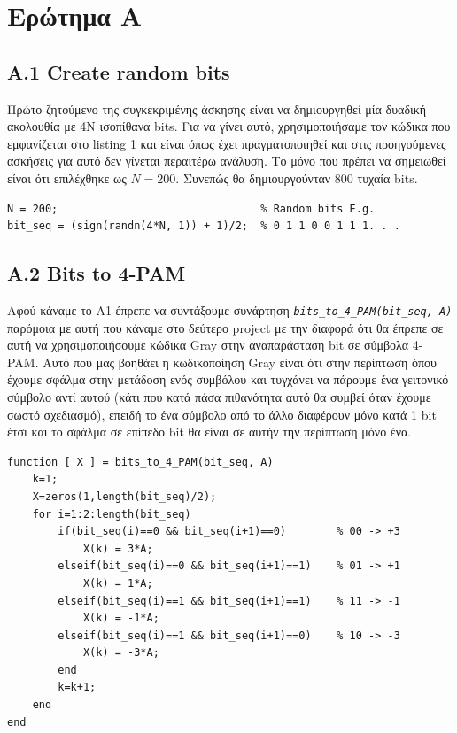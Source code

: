 \documentclass[11pt]{article}
\begin{document}
    \section*{Ερώτημα Α} 
    
    \subsection*{A.1 Create random bits}
    Πρώτο ζητούμενο της συγκεκριμένης άσκησης είναι να δημιουργηθεί μία δυαδική ακολουθία με 4Ν ισοπίθανα bits. 
    Για να γίνει αυτό, χρησιμοποιήσαμε τον κώδικα που εμφανίζεται στο listing 1 και είναι όπως έχει πραγματοποιηθεί και στις προηγούμενες ασκήσεις για αυτό δεν γίνεται περαιτέρω ανάλυση. 
    Το μόνο που πρέπει να σημειωθεί είναι ότι επιλέχθηκε ως $Ν = 200$. 
    Συνεπώς θα δημιουργούνταν 800 τυχαία bits.
    
   \begin{lstlisting}[caption = {A.1 Create random bits}]
% A.1
N = 200;                                % Random bits E.g. 
bit_seq = (sign(randn(4*N, 1)) + 1)/2;  % 0 1 1 0 0 1 1 1. . .
    \end{lstlisting}
    
    \subsection*{A.2 Bits to 4-PAM} 
    Αφού κάναμε το Α1 έπρεπε να συντάξουμε συνάρτηση \emph{\texttt{bits\_to\_4\_PAM(bit\_seq, A)}} παρόμοια με αυτή που κάναμε στο δεύτερο project με την διαφορά ότι θα έπρεπε σε αυτή να χρησιμοποιήσουμε κώδικα Gray στην αναπαράσταση bit σε σύμβολα 4-PAM. 
    Αυτό που μας βοηθάει η κωδικοποίηση Gray είναι ότι στην περίπτωση όπου έχουμε σφάλμα στην μετάδοση ενός συμβόλου και τυγχάνει να πάρουμε ένα γειτονικό σύμβολο αντί αυτού (κάτι που κατά πάσα πιθανότητα αυτό θα συμβεί όταν έχουμε σωστό σχεδιασμό), επειδή το ένα σύμβολο από το άλλο διαφέρουν μόνο κατά 1 bit έτσι και το σφάλμα σε επίπεδο bit θα είναι σε αυτήν την περίπτωση μόνο ένα.

    \newpage
    
    \begin{lstlisting}[caption = {A.2 \texttt{bits\_to\_4\_PAM(bit\_seq, A)}}]
function [ X ] = bits_to_4_PAM(bit_seq, A)
    k=1;
    X=zeros(1,length(bit_seq)/2);
    for i=1:2:length(bit_seq)
        if(bit_seq(i)==0 && bit_seq(i+1)==0)        % 00 -> +3
            X(k) = 3*A;
        elseif(bit_seq(i)==0 && bit_seq(i+1)==1)    % 01 -> +1
            X(k) = 1*A;
        elseif(bit_seq(i)==1 && bit_seq(i+1)==1)    % 11 -> -1
            X(k) = -1*A;
        elseif(bit_seq(i)==1 && bit_seq(i+1)==0)    % 10 -> -3
            X(k) = -3*A;
        end
        k=k+1;
    end
end
    \end{lstlisting}
    
\end{document}
